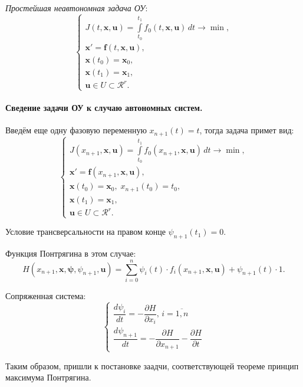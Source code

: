 
\begin{definition}
  \emph{Простейшая неавтономная задача ОУ}:
  \[
    \begin{cases}
      J(t, \mathbf{x}, \mathbf{u}) = \int\limits_{t_0}^{t_1} f_0(t, \mathbf{x}, \mathbf{u}) \, dt \to \min, \\
      \mathbf{x}' = \mathbf{f}(t, \mathbf{x}, \mathbf{u}), \\
      \mathbf{x}(t_0) = \mathbf{x}_0, \\
      \mathbf{x}(t_1) = \mathbf{x}_1, \\
      \mathbf{u} \in U \subset \mathcal{R}^r.
    \end{cases}
  \]
\end{definition}

\paragraph{Сведение задачи ОУ к случаю автономных систем.}

Введём еще одну фазовую переменную $x_{n+1}(t) = t$, тогда задача примет вид:
\[
  \begin{cases}
    J(x_{n+1}, \mathbf{x}, \mathbf{u}) = \int\limits_{t_0}^{t_1} f_0(x_{n+1}, \mathbf{x}, \mathbf{u}) \, dt \to \min, \\
    \mathbf{x}' = \mathbf{f}(x_{n+1}, \mathbf{x}, \mathbf{u}), \\
    \mathbf{x}(t_0) = \mathbf{x}_0, \; x_{n+1}(t_0) = t_0, \\
    \mathbf{x}(t_1) = \mathbf{x}_1, \\
    \mathbf{u} \in U \subset \mathcal{R}^r.
  \end{cases}
\]

Условие трансверсальности на правом конце $\psi_{n+1} (t_1) = 0$.

Функция Понтрягина в этом случае:
\[
  H(x_{n+1}, \mathbf{x}, \mathbf{\psi}, \psi_{n+1}, \mathbf{u}) = \sum_{i=0}^n \psi_i(t) \cdot f_i(x_{n+1}, \mathbf{x}, \mathbf{u}) + \psi_{n+1}(t) \cdot 1.
\]

Сопряженная система:
\[
  \begin{cases}
    \dfrac{d \psi_i}{dt} = - \dfrac{\partial H}{\partial x_i}, \, i = \overline{1, n} \\
    \dfrac{d\psi_{n+1}}{dt} = - \dfrac{\partial H}{\partial x_{n+1}} - \dfrac{\partial H}{\partial t} 
  \end{cases}
\]

Таким образом, пришли к постановке заадчи, соответствующей теореме принцип максимума Понтрягина.


